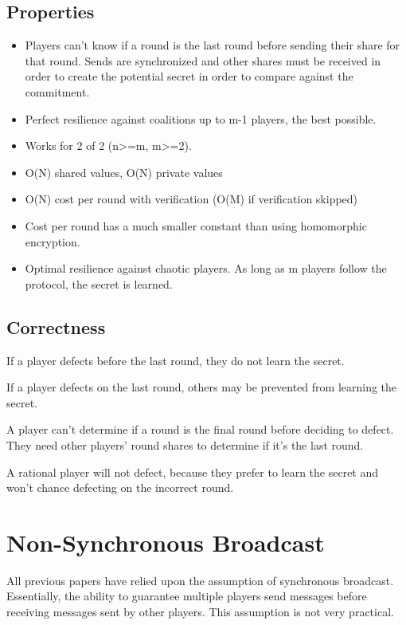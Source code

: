 \documentclass{article}
\begin{document}
\subsection{Properties}
\begin{itemize}
	\item Players can't know if a round is the last round before sending their share for that round.
	\subitem Sends are synchronized and other shares must be received in order to create the potential secret in order to compare against the commitment.
	\item Perfect resilience against coalitions up to m-1 players, the best possible.
	\item Works for 2 of 2 (n>=m, m>=2).
	\item O(N) shared values, O(N) private values
	\item O(N) cost per round with verification (O(M) if verification skipped)
	\item Cost per round has a much smaller constant than using homomorphic encryption.
	\item Optimal resilience against chaotic players. As long as m players follow the protocol, the secret is learned.
\end{itemize}

\subsection{Correctness}

If a player defects before the last round, they do not learn the secret.

If a player defects on the last round, others may be prevented from learning the secret.

A player can't determine if a round is the final round before deciding to defect. They need other players' round shares to determine if it's the last round.

A rational player will not defect, because they prefer to learn the secret and won't chance defecting on the incorrect round.

\section{Non-Synchronous Broadcast}

All previous papers have relied upon the assumption of synchronous broadcast. Essentially, the ability to guarantee multiple players send messages before receiving messages sent by other players. This assumption is not very practical.
\end{document}
